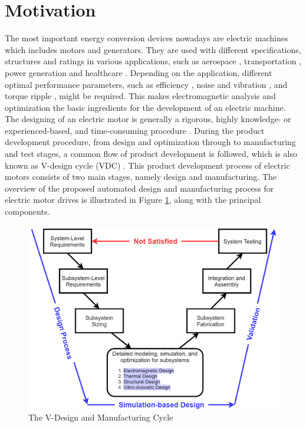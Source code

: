 \section{Motivation}

The most important energy conversion devices nowadays are electric machines which includes motors and generators. They are used with different specifications, structures and ratings in various applications, such as aerospace \parencite{bouzidi2015electromagnetic}, transportation \parencite{bilgin2019modeling}, power generation \parencite{saruwatari2016design} and healthcare \parencite{nicolaescu2012rotary}. Depending on the application, different optimal performance parameters, such as efficiency \parencite{mccoy2014premium}, noise and vibration \parencite{wang2016neural}, \parencite{sheikman2014methods} and torque ripple \parencite{baek2014optimal}, might be required.
This makes electromagnetic analysis and optimization the basic ingredients for the development of an electric machine. 
The designing of an electric motor is generally a rigorous, highly knowledge- or experienced-based, and time-consuming procedure \parencite{mayr2018electric}. During the product development procedure, from design and optimization through to manufacturing and test stages, a common flow of product development is followed, which is also known as V-design cycle (VDC) \parencite{sharafi2013knowledge, rivera2017knowledge}. This product development process of electric motors consists of two main stages, namely design and manufacturing. The overview of the proposed automated design and manufacturing process for electric motor drives is illustrated in Figure \ref{fig:INTRO_The_V_Design_and_Manufacturing_Cycle}, along with the principal components.

\begin{figure}[h!]
    \centering
    \includegraphics[width=\textwidth]{Figures/Chp_Intro/Intro2.png}
    \caption{The V-Design and Manufacturing Cycle}
    \label{fig:INTRO_The_V_Design_and_Manufacturing_Cycle}
\end{figure}

